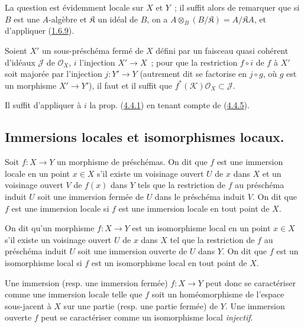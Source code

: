 La question est évidemment locale sur $X$ et $Y$~; il suffit alors de
remarquer que si $B$ est une $A$-algèbre et $\mathfrak{K}$ un idéal de $B$,
on a $A\otimes_B(B/\mathfrak{K})=A/\mathfrak{K}A$, et d'appliquer
(\hyperref[I.1.6.9-fr]{1.6.9}).

\begin{corollary}[4.4.6]
\label{I.4.4.6-fr}
Soient $X'$ un sous-préschéma fermé de $X$ défini par un faisceau quasi
cohérent d'idéaux $\mathscr{J}$ de $\mathscr{O}_X$, $i$ l'injection
$X'\to X$~; pour que la restriction $f\circ i$ de $f$ à $X'$ soit majorée
par l'injection $j:Y'\to Y$ \textup{(autrement dit se factorise en $j\circ g$, où
$g$ est un morphisme $X'\to Y'$)}, il faut et il suffit que
$f^*(\mathscr{K})\mathscr{O}_X\subset\mathscr{J}$.
\end{corollary}

Il suffit d'appliquer à $i$ la prop. (\hyperref[I.4.4.1-fr]{4.4.1}) en
tenant compte de (\hyperref[I.4.4.5-fr]{4.4.5}).

\subsection{Immersions locales et isomorphismes locaux.}
\label{subsection:I.4.5-fr}

\begin{definition}[4.5.1]
\label{I.4.5.1-fr}
Soit $f:X\to Y$ un morphisme de préschémas. On dit que $f$ est une
immersion locale en un point $x\in X$ s'il existe un voisinage ouvert
$U$ de $x$ dans $X$ et un voisinage ouvert $V$ de $f(x)$ dans $Y$ tels que
la restriction de $f$ au préschéma induit $U$ soit une immersion fermée de
$U$ dans le préschéma induit $V$. On dit que $f$ est une immersion locale si
$f$ est une immersion locale en tout point de $X$.
\end{definition}

\begin{definition}[4.5.2]
\label{I.4.5.2-fr}
On dit qu'un morphisme $f:X\to Y$ est un isomorphisme local en
un point $x\in X$ s'il existe un voisinage ouvert $U$ de $x$ dans $X$ tel
que la restriction de $f$ au préschéma induit $U$ soit une immersion ouverte
de $U$ dans $Y$. On dit que $f$ est un isomorphisme local si $f$ est un
isomorphisme local en tout point de $X$.
\end{definition}

\begin{env}[4.5.3]
\label{I.4.5.3-fr}
Une immersion (resp. une immersion fermée) $f:X\to Y$ peut donc se
caractériser comme une immersion locale telle que $f$ soit un homéomorphisme
de l'espace sous-jacent à $X$ sur une partie (resp. une partie fermée) de
$Y$. Une immersion ouverte $f$ peut se caractériser comme un isomorphisme
local \emph{injectif}.
\end{env}


